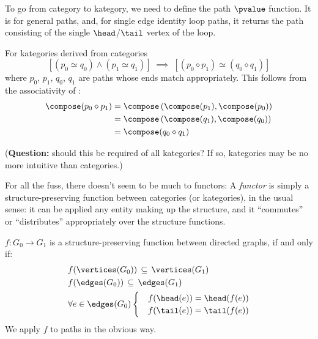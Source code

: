 \documentclass[11pt,openany]{book}
\begin{document}
To go from category to kategory, we need to define the 
path $\pvalue$ function.
It is \compose for general paths, and, 
for single edge identity loop paths,
it returns the 
path consisting of the single 
$\head$/$\tail$ vertex of the loop.

For kategories derived from categories
\begin{equation*}
\left[ \left( p_0 \simeq q_0 \right) \wedge 
 \left( p_1 \simeq q_1  \right) \right]
\; \implies \; 
\left[
\left( p_0 \diamond p_1 \right)
\simeq
\left( q_0 \diamond q_1 \right)
\right]
\end{equation*}
where $p_0$, $p_1$, $q_0$, $q_1$ are paths 
whose ends match appropriately.
This follows from the associativity of \compose:
\begin{align*}
\compose(p_0 \diamond p_1) 
& = 
\compose \left( 
\compose(p_1),
\compose(p_0) \right)
\\
& = 
\compose \left( 
\compose(q_1),
\compose(q_0) \right)
\\
& = 
\compose(q_0 \diamond q_1) 
\end{align*}
 
(\textbf{Question:} should this be required of all kategories?
If so, kategories may be no more intuitive than categories.)

\label{sec:functor}

For all the fuss, there doesn't seem to be much to functors:
A \textit{functor} is simply a structure-preserving function
between categories (or kategories), in the usual sense:
it can be applied any entity 
making up the structure,
and it ``commutes'' or ``distributes'' appropriately
over the structure functions.

\begin{definition}
$f:G_0 \rightarrow G_1$ is a structure-preserving function
between directed graphs, if and only if:
\begin{align*}
  & f(\vertices(G_0)) \, \subseteq \, \vertices(G_1) \\
  & f(\edges(G_0)) \, \subseteq \, \edges(G_1) \\
  & \forall e \in \edges(G_0) 
  \begin{cases}
  & f(\head(e)) = \head(f(e)) \\
  & f(\tail(e)) = \tail(f(e))
  \end{cases}
\end{align*}
We apply $f$ to paths in the obvious way.
\end{definition}
\end{document}
